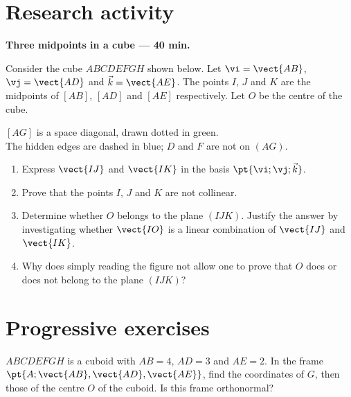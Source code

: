 \section{Research activity}\textbf{Three midpoints in a cube --- 40 min.}\par Consider the cube $ABCDEFGH$ shown below. Let $\vi=\vect{AB}$, $\vj=\vect{AD}$ and $\vec k=\vect{AE}$. The points $I$, $J$ and $K$ are the midpoints of $[AB]$, $[AD]$ and $[AE]$ respectively. Let $O$ be the centre of the cube.
\begin{center}\par\small $[AG]$ is a space diagonal, drawn dotted in green.\\The hidden edges are dashed in blue; $D$ and $F$ are not on $(AG)$.\end{center}
\begin{enumerate}\item Express $\vect{IJ}$ and $\vect{IK}$ in the basis $\pt{\vi;\vj;\vec k}$.
\item Prove that the points $I$, $J$ and $K$ are not collinear.
\item Determine whether $O$ belongs to the plane $(IJK)$. Justify the answer by investigating whether $\vect{IO}$ is a linear combination of $\vect{IJ}$ and $\vect{IK}$.
\item Why does simply reading the figure not allow one to prove that $O$ does or does not belong to the plane $(IJK)$?\end{enumerate}

\mxnewpage
\section{Progressive exercises}

$ABCDEFGH$ is a cuboid with $AB=4$, $AD=3$ and $AE=2$. In the frame $\pt{A;\vect{AB},\vect{AD},\vect{AE}}$, find the coordinates of $G$, then those of the centre $O$ of the cuboid. Is this frame orthonormal?

